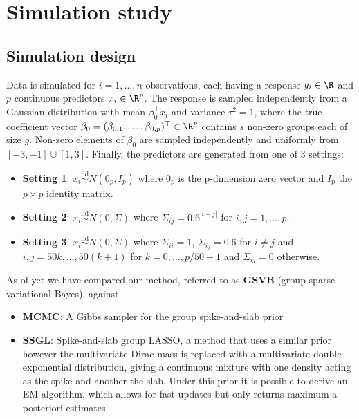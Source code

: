 \newpage
\section{Simulation study}

\subsection{Simulation design}

Data is simulated for $i=1,\dots,n$ observations, each having a response $y_i \in \R$ and $p$ continuous predictors $x_i \in \R^p$. The response is sampled independently from a Gaussian distribution with mean $\beta_0^\top x_i$ and variance $\tau^2 = 1$, where the true coefficient vector $\beta_0 = (\beta_{0, 1}, \dots, \beta_{0, p})^\top \in \R^p$ contains $s$ non-zero groups each of size $g$. Non-zero elements of $\beta_{0}$ are sampled independently and uniformly from $[-3,-1] \cup [1,3]$. Finally, the predictors are generated from one of 3 settings:
\begin{itemize}
    \item \textbf{Setting 1}: $x_i \overset{\text{iid}}{\sim} N(0_p, I_p)$ where $0_p$ is the p-dimension zero vector and $I_p$ the $p\times p$ identity matrix.
    \item \textbf{Setting 2}: $x_i \overset{\text{iid}}{\sim} N(0, \Sigma)$ where $\Sigma_{ij} = 0.6^{|i - j|}$ for $i,j=1,\dots,p$.
    \item \textbf{Setting 3}: $x_i \overset{\text{iid}}{\sim} N(0, \Sigma)$  where $\Sigma_{ii} = 1$, $\Sigma_{ij}=0.6$ for $i\neq j$ and $i, j = 50k, \dots, 50(k+1)$ for $k=0,\dots, p/50 -1$ and $\Sigma_{ij} =0$ otherwise.
\end{itemize}

As of yet we have compared our method, referred to as \textbf{GSVB} (group sparse variational Bayes), against
\begin{itemize}
    \item \textbf{MCMC}: A Gibbs sampler for the group spike-and-slab prior
    \item \textbf{SSGL}: Spike-and-slab group LASSO, a method that uses a similar prior however the multivariate Dirac mass is replaced with a multivariate double exponential distribution, giving a continuous mixture with one density acting as the spike and another the slab. Under this prior it is possible to derive an EM algorithm, which allows for fast updates but only returns maximum a posteriori estimates.
\end{itemize}

